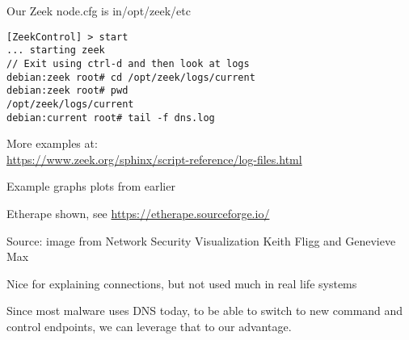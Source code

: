 \documentclass[Screen16to9,17pt]{foils}
\begin{document}
\centerline{Our Zeek node.cfg is in/opt/zeek/etc}


\begin{verbatim}
[ZeekControl] > start
... starting zeek
// Exit using ctrl-d and then look at logs
debian:zeek root# cd /opt/zeek/logs/current
debian:zeek root# pwd
/opt/zeek/logs/current
debian:current root# tail -f dns.log
\end{verbatim}

More examples at:\\
\url{https://www.zeek.org/sphinx/script-reference/log-files.html}








Example graphs plots from earlier
\begin{list2}
\item
\end{list2}





\begin{list2}
  \item Etherape shown, see \url{https://etherape.sourceforge.io/}
\end{list2}



Source: image from Network Security Visualization Keith Fligg and Genevieve Max\\

\begin{list2}
\item {}
\item Nice for explaining connections, but not used much in real life systems
\end{list2}





Since most malware uses DNS today, to be able to switch to new command and control endpoints, we can leverage that to our advantage.
\end{document}
